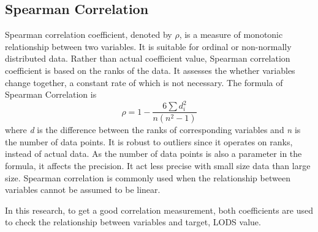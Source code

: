 \documentclass[12pt,a4paper,english
]{tunithesis}
\begin{document}
\subsection{Spearman Correlation}
Spearman correlation coefficient, denoted by \(\rho\), is a measure of monotonic relationship between two variables. It is suitable for ordinal or non-normally distributed data. Rather than actual coefficient value, Spearman correlation coefficient is based on the ranks of the data. It assesses the whether variables change together, a constant rate of which is not necessary. The formula of Spearman Correlation is
\begin{equation}
    \rho = 1- {\frac {6 \sum d_i^2}{n(n^2 - 1)}}
\end{equation}
where \textit{d} is the difference between the ranks of corresponding variables and \textit{n} is the number of data points. It is robust to outliers since it operates on ranks, instead of actual data. As the number of data points is also a parameter in the formula, it affects the precision. It act less precise with small size data than large size. Spearman correlation is commonly used when  the relationship between variables cannot be assumed to be linear.

In this research, to get a good correlation measurement, both coefficients are used to check the relationship between variables and target, LODS value.
\end{document}

